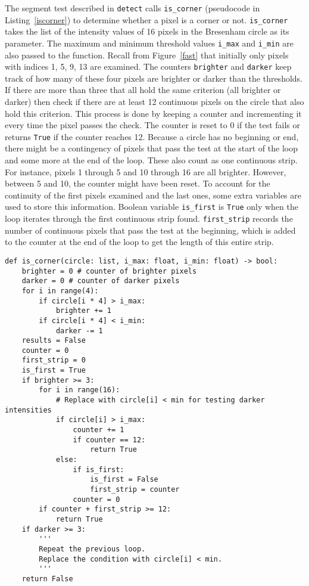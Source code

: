 The segment test described in \texttt{detect} calls \texttt{is\_corner} (pseudocode in Listing~\ref{iscorner}) to determine whether a pixel is a corner or not. \texttt{is\_corner} takes the list of the intensity values of 16 pixels in the Bresenham circle as its parameter.  The maximum and minimum threshold values \texttt{i\_max} and \texttt{i\_min} are also passed to the function. Recall from Figure~\ref{fast} that initially only pixels with indices 1, 5, 9, 13 are examined. The counters \texttt{brighter} and \texttt{darker} keep track of how many of these four pixels are brighter or darker than the thresholds. If there are more than three that all hold the same criterion (all brighter or darker) then check if there are at least 12 continuous pixels on the circle that also hold this criterion. This process is done by keeping a counter and incrementing it every time the pixel passes the check. The counter is reset to 0 if the test fails or returns \texttt{True} if the counter reaches 12. Because a circle has no beginning or end, there might be a contingency of pixels that pass the test at the start of the loop and some more at the end of the loop. These also count as one continuous strip. For instance, pixels 1 through 5 and 10 through 16 are all brighter. However, between 5 and 10, the counter might have been reset. To account for the continuity of the first pixels examined and the last ones, some extra variables are used to store this information. Boolean variable \texttt{is\_first} is \texttt{True} only when the loop iterates through the first continuous strip found. \texttt{first\_strip} records the number of continuous pixels that pass the test at the beginning, which is added to the counter at the end of the loop to get the length of this entire strip.

\begin{singlespace}
\begin{lstlisting}[mathescape, caption= Check for corner at pixel with given Bresenham circle, label=iscorner]
def is_corner(circle: list, i_max: float, i_min: float) -> bool:
    brighter = 0 # counter of brighter pixels
    darker = 0 # counter of darker pixels
    for i in range(4):
        if circle[i * 4] > i_max:
            brighter += 1
        if circle[i * 4] < i_min:
            darker -= 1
    results = False
    counter = 0
    first_strip = 0
    is_first = True
    if brighter >= 3:
        for i in range(16):    
            # Replace with circle[i] < min for testing darker intensities
            if circle[i] > i_max: 
                counter += 1
                if counter == 12:
                    return True
            else:
                if is_first:
                    is_first = False
                    first_strip = counter
                counter = 0
        if counter + first_strip >= 12:
            return True
    if darker >= 3:
        '''
        Repeat the previous loop. 
        Replace the condition with circle[i] < min.
        '''
    return False
\end{lstlisting}
\end{singlespace}

